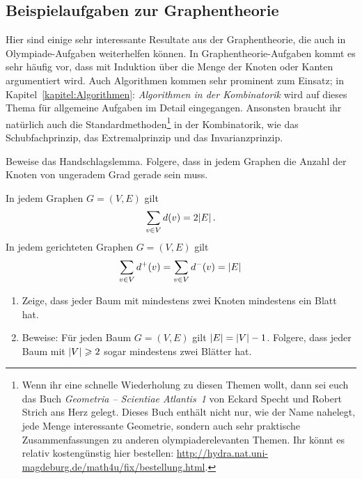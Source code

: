 \subsection*{Beispielaufgaben zur Graphentheorie}
Hier sind einige sehr interessante Resultate aus der Graphentheorie, die auch in Olympiade-Aufgaben weiterhelfen können. In Graphentheorie-Aufgaben kommt es sehr häufig vor, dass mit Induktion über die Menge der Knoten oder Kanten argumentiert wird. Auch Algorithmen kommen sehr prominent zum Einsatz; in Kapitel~\ref{kapitel:Algorithmen}: \emph{Algorithmen in der Kombinatorik} wird auf dieses Thema für allgemeine Aufgaben im Detail eingegangen. Ansonsten braucht ihr natürlich auch die Standardmethoden\footnote{Wenn ihr eine schnelle Wiederholung zu diesen Themen wollt, dann sei euch das Buch \emph{Geometria -- Scientiae Atlantis~1} von Eckard Specht und Robert Strich ans Herz gelegt. Dieses Buch enthält nicht nur, wie der Name nahelegt, jede Menge interessante Geometrie, sondern auch sehr praktische Zusammenfassungen zu anderen olympiaderelevanten Themen. Ihr könnt es relativ kostengünstig hier bestellen: \url{http://hydra.nat.uni-magdeburg.de/math4u/fix/bestellung.html}.} in der Kombinatorik, wie das Schubfachprinzip, das Extremalprinzip und das Invarianzprinzip.
\begin{aufgabe*}\label{aufgabe:Handschlagslemma}
	Beweise das Handschlagslemma. Folgere, dass in jedem Graphen die Anzahl der Knoten von ungeradem Grad gerade sein muss.
	\begin{satzmitnamen}[Handschlagslemma]
		In jedem Graphen $G=(V,E)$ gilt
		\begin{equation*}
			\sum_{v\in V} d(v) = 2\abs{E}\,.
		\end{equation*}
		In jedem gerichteten Graphen $G=(V,E)$ gilt
		\begin{equation*}
			\sum_{v\in V}d^+(v)=\sum_{v\in V}d^-(v)=\abs{E}\,
		\end{equation*}
	\end{satzmitnamen}
\end{aufgabe*}
\begin{aufgabe*}\label{aufgabe:Blatt}
	\begin{enumerate}
		\item \label{teilaufgabe:BaumHatBlaetter}Zeige, dass jeder Baum mit mindestens zwei Knoten mindestens ein Blatt hat.
		\item \label{teilaufgabe:BaumKnotenKanten}Beweise: Für jeden Baum $G=(V,E)$ gilt $\abs{E} = \abs{V} -1$. Folgere, dass jeder Baum mit $\abs*{V}\geqslant 2$ sogar mindestens zwei Blätter hat.
	\end{enumerate}
\end{aufgabe*}
